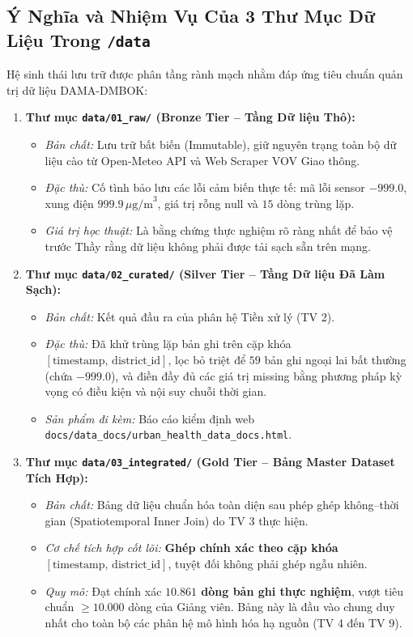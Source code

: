 \documentclass[11pt,a4paper]{article}
\begin{document}
\subsection{Ý Nghĩa và Nhiệm Vụ Của 3 Thư Mục Dữ Liệu Trong \texttt{/data}}
Hệ sinh thái lưu trữ được phân tầng rành mạch nhằm đáp ứng tiêu chuẩn quản trị dữ liệu DAMA-DMBOK:
\begin{enumerate}
    \item \textbf{Thư mục \texttt{data/01\_raw/} (Bronze Tier -- Tầng Dữ liệu Thô):} 
    \begin{itemize}
        \item \textit{Bản chất:} Lưu trữ bất biến (Immutable), giữ nguyên trạng toàn bộ dữ liệu cào từ Open-Meteo API và Web Scraper VOV Giao thông.
        \item \textit{Đặc thù:} Cố tình bảo lưu các lỗi cảm biến thực tế: mã lỗi sensor $-999.0$, xung điện $999.9\,\mu\text{g/m}^3$, giá trị rỗng $\text{null}$ và $15$ dòng trùng lặp.
        \item \textit{Giá trị học thuật:} Là bằng chứng thực nghiệm rõ ràng nhất để bảo vệ trước Thầy rằng dữ liệu không phải được tải sạch sẵn trên mạng.
    \end{itemize}
    \item \textbf{Thư mục \texttt{data/02\_curated/} (Silver Tier -- Tầng Dữ liệu Đã Làm Sạch):}
    \begin{itemize}
        \item \textit{Bản chất:} Kết quả đầu ra của phân hệ Tiền xử lý (TV 2).
        \item \textit{Đặc thù:} Đã khử trùng lặp bản ghi trên cặp khóa $[\text{timestamp}, \, \text{district\_id}]$, lọc bỏ triệt để $59$ bản ghi ngoại lai bất thường (chứa $-999.0$), và điền đầy đủ các giá trị missing bằng phương pháp kỳ vọng có điều kiện và nội suy chuỗi thời gian.
        \item \textit{Sản phẩm đi kèm:} Báo cáo kiểm định web \texttt{docs/data\_docs/urban\_health\_data\_docs.html}.
    \end{itemize}
    \item \textbf{Thư mục \texttt{data/03\_integrated/} (Gold Tier -- Bảng Master Dataset Tích Hợp):}
    \begin{itemize}
        \item \textit{Bản chất:} Bảng dữ liệu chuẩn hóa toàn diện sau phép ghép không--thời gian (Spatiotemporal Inner Join) do TV 3 thực hiện.
        \item \textit{Cơ chế tích hợp cốt lõi:} \textbf{Ghép chính xác theo cặp khóa $[\text{timestamp}, \, \text{district\_id}]$}, tuyệt đối không phải ghép ngẫu nhiên.
        \item \textit{Quy mô:} Đạt chính xác \textbf{$10.861$ dòng bản ghi thực nghiệm}, vượt tiêu chuẩn $\ge 10.000$ dòng của Giảng viên. Bảng này là đầu vào chung duy nhất cho toàn bộ các phân hệ mô hình hóa hạ nguồn (TV 4 đến TV 9).
    \end{itemize}
\end{enumerate}
\end{document}
